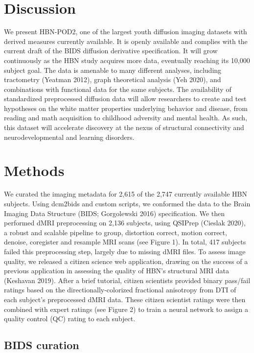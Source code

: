 \documentclass[fleqn,10pt]{wlscirep}
\begin{document}
\section*{Discussion}

We present HBN-POD2, one of the largest youth diffusion imaging datasets with derived measures currently available. It is openly available and complies with the current draft of the BIDS diffusion derivative specification. It will grow continuously as the HBN study acquires more data, eventually reaching its 10,000 subject goal. The data is amenable to many different analyses, including tractometry (Yeatman 2012), graph theoretical analysis (Yeh 2020), and combinations with functional data for the same subjects. The availability of standardized preprocessed diffusion data will allow researchers to create and test hypotheses on the white matter properties underlying behavior and disease, from reading and math acquisition to childhood adversity and mental health. As such, this dataset will accelerate discovery at the nexus of structural connectivity and neurodevelopmental and learning disorders.

\section*{Methods}

We curated the imaging metadata for 2,615 of the 2,747 currently available HBN subjects. Using dcm2bids and custom scripts, we conformed the data to the Brain Imaging Data Structure (BIDS; Gorgolewski 2016) specification. We then performed dMRI preprocessing on 2,136 subjects, using QSIPrep (Cieslak 2020), a robust and scalable pipeline to group, distortion correct, motion correct, denoise, coregister and resample MRI scans (see Figure 1). In total, 417 subjects failed this preprocessing step, largely due to missing dMRI files. To assess image quality, we released a citizen science web application, drawing on the success of a previous application in assessing the quality of HBN's structural MRI data (Keshavan 2019). After a brief tutorial, citizen scientists provided binary pass/fail ratings based on the directionally-colorized fractional anisotropy from DTI of each subject's preprocessed dMRI data. These citizen scientist ratings were then combined with expert ratings (see Figure 2) to train a neural network to assign a quality control (QC) rating to each subject.

\subsection*{BIDS curation}
\end{document}

